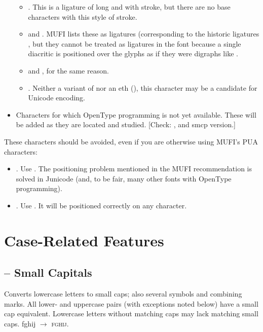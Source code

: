 \begin{itemize}
\begin{itemize}
\item {} . This is a ligature of long  and  with stroke,
but there are no base characters with this style of stroke.
\item {}  and . MUFI lists these as ligatures (corresponding to the
historic ligatures , but they cannot be treated as ligatures in the
font because a single diacritic is positioned over the glyphs as if they were digraphs like
.
\item {}  and , for the same reason.
\item {}  . Neither a variant of
 nor an eth (), this character may be a candidate for Unicode
encoding.
\end{itemize}
\item Characters for which OpenType programming is not yet available. These will be added as they are located and
studied. [Check: , and smcp version.]
\end{itemize}
These characters should be avoided, even if you are otherwise using MUFI’s PUA characters:

\liststyleLii
\begin{itemize}
\item {} . Use  . The
positioning problem mentioned in the MUFI recommendation is solved in Junicode (and, to be fair, many other fonts with
OpenType programming).
\item {} . Use  . It
will be positioned correctly on any character.
\end{itemize}

\section{Case-Related Features}
\subsection{ -- Small Capitals}
Converts lowercase letters to small caps; also several symbols and combining marks. All lower- and uppercase pairs (with
exceptions noted below) have a small cap equivalent. Lowercase letters without matching caps may lack matching small
caps. fghij $\rightarrow $ \textsc{fghij}.


